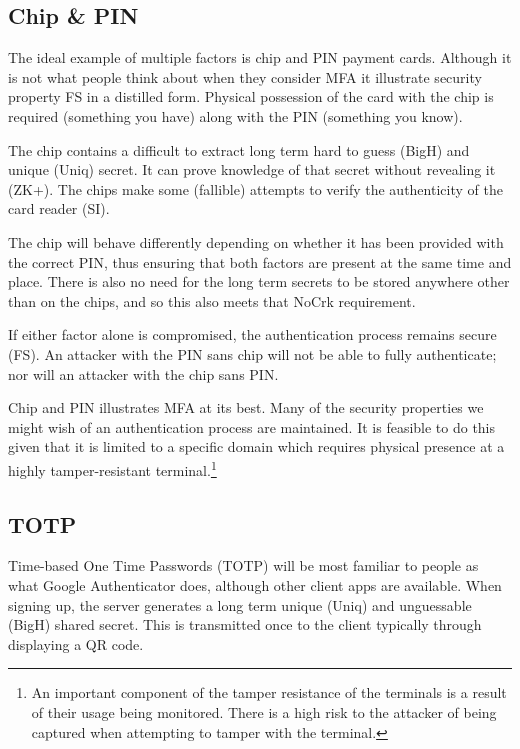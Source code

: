 \documentclass[12pt]{article}
\newcommand{\prop}[1]{\textsf{#1}}
\begin{document}
\subsection{Chip \& PIN}

The ideal example of multiple factors is chip and PIN payment cards. Although it is not what people think about when they consider MFA it illustrate security property \prop{FS} in a distilled form.
Physical possession of the card with the chip is required (something you have) along with the PIN (something you know).

The chip contains a difficult to extract long term hard to guess (\prop{BigH}) and unique (\prop{Uniq}) secret. It can prove knowledge of that secret without revealing it (\prop{ZK+}). The chips make some (fallible) attempts to verify the authenticity of the card reader (\prop{SI}).

The chip will behave differently depending on whether it has been provided with the correct PIN, thus ensuring that both factors are present at the same time and place. There is also no need for the long term secrets to be stored anywhere other than on the chips, and so this also meets that \prop{NoCrk} requirement.

If either factor alone is compromised, the authentication process remains secure (\prop{FS}).
An attacker with the PIN sans chip will not be able to fully authenticate; nor will an attacker with the chip sans PIN\@.


Chip and PIN illustrates MFA at its best. Many of the security properties we might wish of an authentication process are maintained. It is feasible to do this given that it is limited to a specific domain which requires physical presence at a highly tamper-resistant terminal.\footnote{An important component of the tamper resistance of the terminals is a result of their usage being monitored. There is a high risk to the attacker of being captured when attempting to tamper with the terminal.}

\subsection{TOTP}\label{sec:totp}

Time-based One Time Passwords (TOTP) will be most familiar to people as what Google Authenticator does, although other client apps are available.
When signing up, the server generates a long term unique (\prop{Uniq}) and unguessable (\prop{BigH}) shared secret. This is transmitted once to the client typically through displaying a QR code. 
\end{document}
